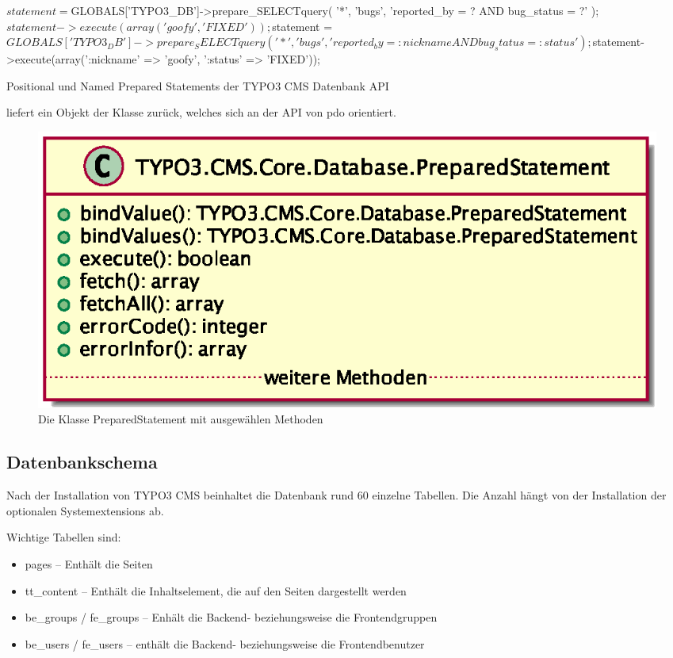 \begin{listing}
\begin{phpcode}
$statement = $GLOBALS['TYPO3_DB']->prepare_SELECTquery(
  '*', 'bugs', 'reported_by = ? AND bug_status = ?'
);
$statement->execute(array('goofy', 'FIXED'));

$statement = $GLOBALS['TYPO3_DB']->prepare_SELECTquery(
  '*', 'bugs', 'reported_by = :nickname AND bug_status = :status'
);
$statement->execute(array(':nickname' => 'goofy', ':status' => 'FIXED'));
\end{phpcode}
\caption{Positional und Named Prepared Statements der TYPO3 CMS Datenbank API}
\label{lst:databaseOldPreparedStatement}
\end{listing}

 liefert ein Objekt der Klasse  zurück, welches sich an der API von \gls{pdo} orientiert.

\begin{figure}[H]
    \centering
    \includegraphics[scale=0.75]{gfx/uml/PreparedStatement.eps}
    \caption{Die Klasse PreparedStatement mit ausgewählen Methoden}
    \label{fig:selectedMethodsOfPreparedStatements}
\end{figure}

\subsection{Datenbankschema}
\label{currentSituation:subsec:databaseSchema}
Nach der Installation von TYPO3 CMS beinhaltet die Datenbank rund 60 einzelne Tabellen. Die Anzahl hängt von der Installation der optionalen Systemextensions ab.

Wichtige Tabellen sind:
\begin{itemize}
	\item pages – Enthält die Seiten
	\item tt\_content – Enthält die Inhaltselement, die auf den Seiten dargestellt werden
	\item be\_groups / fe\_groups – Enhält die Backend- beziehungsweise die Frontendgruppen
	\item be\_users / fe\_users – enthält die Backend- beziehungsweise die Frontendbenutzer
\end{itemize}

